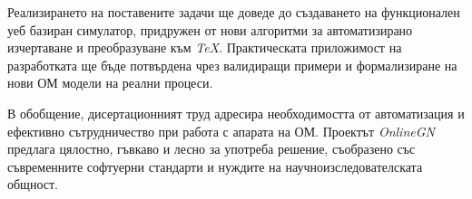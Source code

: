 Реализирането на поставените задачи ще доведе до създаването на функционален уеб базиран симулатор, придружен от нови алгоритми за автоматизирано изчертаване и преобразуване към \textit{TeX}. Практическата приложимост на разработката ще бъде потвърдена чрез валидиращи примери и формализиране на нови ОМ модели на реални процеси.

\vspace{0.5cm}

В обобщение, дисертационният труд адресира необходимостта от автоматизация и ефективно сътрудничество при работа с апарата на ОМ. Проектът \textit{OnlineGN} предлага цялостно, гъвкаво и лесно за употреба решение, съобразено със съвременните софтуерни стандарти и нуждите на научноизследователската общност.

